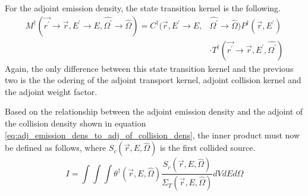 For the adjoint emission density, the state transition kernel is the following.
\begin{equation}
  \begin{split}
    M^{\dagger}(\vec{r^{'}} \to \vec{r},E^{'} \to E,\hat{\Omega^{'}} \to \hat{\Omega})
    = C^{\dagger}(\vec{r},E^{'} \to E,&\hat{\Omega^{'}} \to \hat{\Omega})
    P^{\dagger}(\vec{r},E^{'})  \\
    & \cdot T^{\dagger}(\vec{r^{'}} \to \vec{r},E^{'},\hat{\Omega^{'}}) 
  \end{split}
\end{equation}
Again, the only difference between this state transition kernel and the 
previous two is the the odering of the adjoint transport kernel, adjoint
collision kernel and the adjoint weight factor. 

Based on the relationship between the adjoint emission density and the adjoint
of the collision density shown in equation 
\ref{eq:adj_emission_dens_to_adj_of_collision_dens}, the inner product must now
be defined as follows, where $S_c(\vec{r},E,\hat{\Omega})$ is the first
collided source.
\begin{equation}
  I = \int\int\int \theta^{\dagger}(\vec{r},E,\hat{\Omega})
  \frac{S_c(\vec{r},E,\hat{\Omega})}{\Sigma_T(\vec{r},E,\hat{\Omega})}
  dV dE d\hat{\Omega}
\end{equation}
